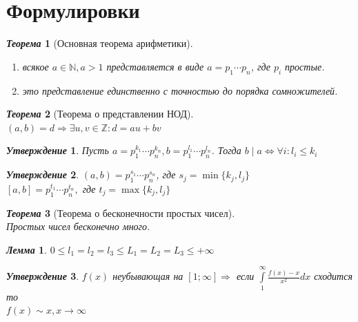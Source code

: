 \documentclass[a4paper,12pt]{article}
\newtheorem{teo2}{\textit{Теорема}}
\newtheorem{utv2}{\textit{Утверждение}}
\newtheorem{lem2}{\textit{Лемма}}
\newcommand{\q}{\quad}
\newcommand{\Ra}{\Rightarrow}
\newcommand{\bb}[1]{\mathbb{#1}}
\newcommand{\IL}{\int\limits}
\begin{document}
\section{Формулировки}
\begin{formbox}{}
\begin{teo2}[Основная теорема арифметики]\q\\
\begin{enumerate}
\item всякое $a \in \bb{N}, a > 1$ представляется в виде $a = p_1\cdots p_n$, где $p_i$ простые.
\item это представление единственно с точностью до порядка сомножителей.
\end{enumerate}
\end{teo2}
\end{formbox}
\begin{formbox}{}
\begin{teo2}[Теорема о представлении НОД]\q\\
$(a,b) = d \Ra \exists u,v\in\bb{Z}: d = au+bv$
\end{teo2}
\end{formbox}
\begin{formbox}{}
\begin{utv2} Пусть $a = p_1^{k_1}\cdots p_n^{k_n}, b = p_1^{l_1}\cdots p_n^{l_n}$. Тогда $b\mid a\iff \forall i: l_i \le k_i$
\end{utv2}
\end{formbox}
\begin{formbox}{}
\begin{utv2} $(a,b) = p_1^{s_1}\cdots p_n^{s_n}$, где $s_j = \min\{k_j, l_j\}$\\
$[a,b] = p_1^{t_1}\cdots p_n^{t_n},$ где $t_j = \max\{k_j, l_j\}$
\end{utv2}
\end{formbox}
\begin{formbox}{}
\begin{teo2}[Теорема о бесконечности простых чисел]\q\\
Простых чисел бесконечно много.
\end{teo2}
\end{formbox}
\begin{formbox}{}
\begin{lem2}
$0\le l_1 = l_2 = l_3 \le L_1 = L_2 = L_3 \le +\infty$
\end{lem2}
\end{formbox}
\begin{formbox}{}
\begin{utv2} $f(x)$ неубывающая на $[1;\infty]\Ra$ если $\IL_1^\infty \frac{f(x) - x}{x^2}dx$ сходится то \\$f(x)\sim x, x\to\infty$
\end{utv2}
\end{formbox}
\end{document}

